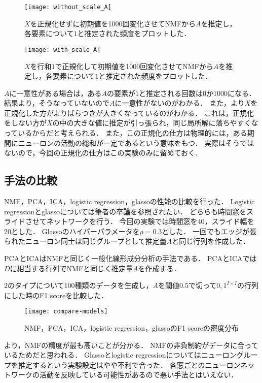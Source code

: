 \begin{figure}[htbp]
    \begin{minipage}{0.5\hsize}
			\begin{center}
					\texttt{[image: without\_scale\_A]}
					\caption{$X$を正規化せずに初期値を1000回変化させてNMFから$A$を推定し，各要素について$1$と推定された頻度をプロットした．}
					\label{fig:without_scale_A}
			\end{center}
		\end{minipage}
    \begin{minipage}{0.5\hsize}
			\begin{center}
					\texttt{[image: with\_scale\_A]}
					\caption{$X$を行和$1$で正規化して初期値を1000回変化させてNMFから$A$を推定し，各要素について$1$と推定された頻度をプロットした．}
					\label{fig:with_scale_A}
			\end{center}
		\end{minipage}
\end{figure}

$A$に一意性がある場合は，ある$A$の要素が$1$と推定される回数は$0$か$1000$になる．
結果より，そうなっていないので$A$に一意性がないのがわかる．
また，より$X$を正規化した方がよりばらつきが大きくなっているのがわかる．
これは，正規化をしない方が$X$の中の大きな値に推定が引っ張られ，同じ局所解に落ちやすくなっているからだと考えられる．
また，この正規化の仕方は物理的には，ある期間にニューロンの活動の総和が一定であるという意味をもつ．
実際はそうではないので，今回の正規化の仕方はこの実験のみに留めておく．

\subsection{手法の比較}
NMF，PCA，ICA，logistic regression，glassoの性能の比較を行った．
Logistic regressionとglassoについては筆者の卒論を参照されたい．
どちらも時間窓をスライドさせてネットワークを行う．
今回の実験では時間窓を40，スライド幅を20とした．
Glassoのハイパーパラメータを$\rho = 0.3$とした．
一回でもエッジが張られたニューロン同士は同じグループとして推定量$A$と同じ行列を作成した．

PCAとICAはNMFと同じく一般化線形成分分析の手法\cite{Cichocki2009}である．
PCAとICAでは$D$に相当する行列でNMFと同じく推定量$A$を作成する．

2のタイプについて100種類のデータを生成し，$A$を閾値$0.5$で切って${0,1}^{I \times I}$の行列にした時のF1 scoreを比較した．
\begin{figure}[htbp]
    \begin{center}
        \texttt{[image: compare-models]}
        \caption{NMF，PCA，ICA，logistic regression，glassoのF1 scoreの密度分布}
        \label{fig:compare-models}
    \end{center}
\end{figure}
より，NMFの精度が最も高いことが分かる．
NMFの非負制約がデータに合っているためだと思われる．
Glassoとlogistic regressionについてはニューロングループを推定するという実験設定はやや不利で合った．
各窓ごとのニューロンネットワークの活動を反映している可能性があるので悪い手法とはいえない．

